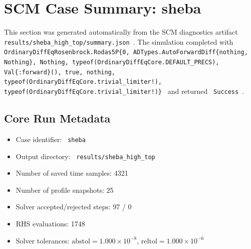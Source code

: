 \section{SCM Case Summary: sheba}
\label{sec:scm_case_sheba_high_top_sheba_250x2m_12h_report}

This section was generated automatically from the SCM diagnostics artifact
\texttt{ results/sheba\_high\_top/summary.json }. The simulation completed with \texttt{ OrdinaryDiffEqRosenbrock.Rodas5P\{0, ADTypes.AutoForwardDiff\{nothing, Nothing\}, Nothing, typeof(OrdinaryDiffEqCore.DEFAULT\_PRECS), Val\{:forward\}(), true, nothing, typeof(OrdinaryDiffEqCore.trivial\_limiter!), typeof(OrdinaryDiffEqCore.trivial\_limiter!)\} }
and returned \texttt{ Success }.

\subsection{Core Run Metadata}
\begin{itemize}
  \item Case identifier: \texttt{ sheba }
  \item Output directory: \texttt{ results/sheba\_high\_top }
  \item Number of saved time samples: 4321
  \item Number of profile snapshots: 25
  \item Solver accepted/rejected steps: 97 / 0
  \item RHS evaluations: 1748
  \item Solver tolerances: $\mathrm{abstol}=1.000 \times 10^{-8}$, $\mathrm{reltol}=1.000 \times 10^{-6}$
\end{itemize}

